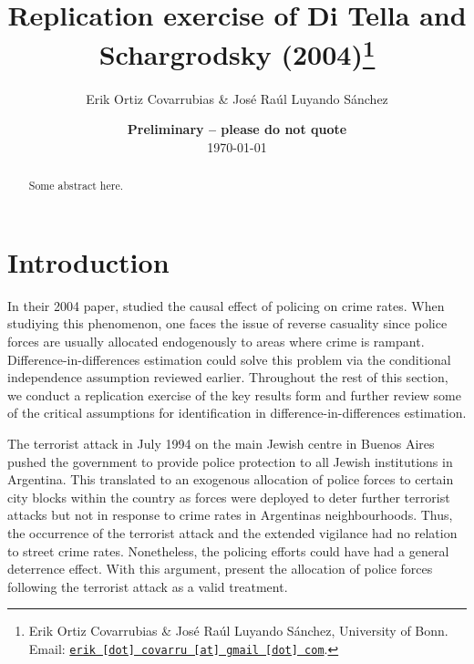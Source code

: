 \documentclass[11pt, a4paper, leqno]{article}
\begin{document}
\title{Replication exercise of Di Tella and Schargrodsky (2004)\thanks{Erik Ortiz Covarrubias \& José Raúl Luyando Sánchez, University of Bonn. Email: \href{mailto:erik.covarru@gmail.com}{\nolinkurl{erik [dot] covarru [at] gmail [dot] com}}.}}

\author{Erik Ortiz Covarrubias \& José Raúl Luyando Sánchez}

\date{
    {\bf Preliminary -- please do not quote}
    \\[1ex]
    \today
}

\maketitle


\begin{abstract}
    Some abstract here.
\end{abstract}

\clearpage


\section{Introduction} %
\label{sec:introduction}

In their 2004 paper, \citeauthor{di2004police} studied the causal effect of policing on crime rates. When studiying this phenomenon, one faces the issue of reverse casuality since police forces are usually allocated endogenously to areas where crime is rampant. Difference-in-differences estimation could solve this problem via the conditional independence assumption reviewed earlier. Throughout the rest of this section, we conduct a replication exercise of the key results
form \citet{di2004police} and further review some of the critical assumptions for identification in difference-in-differences estimation.

 The terrorist attack in July 1994 on the main Jewish centre in Buenos Aires pushed the government to provide police protection to all Jewish institutions in Argentina. This translated to an exogenous allocation of police forces to certain city blocks within the country as forces were deployed to deter further terrorist attacks but not in response to crime rates in Argentinas neighbourhoods. Thus, the occurrence of the terrorist attack and the extended vigilance had no relation to street crime rates. Nonetheless, the policing efforts could have had a general deterrence effect. With this argument, \citeauthor{di2004police} present the allocation of police forces following the terrorist attack as a valid treatment.
\end{document}
